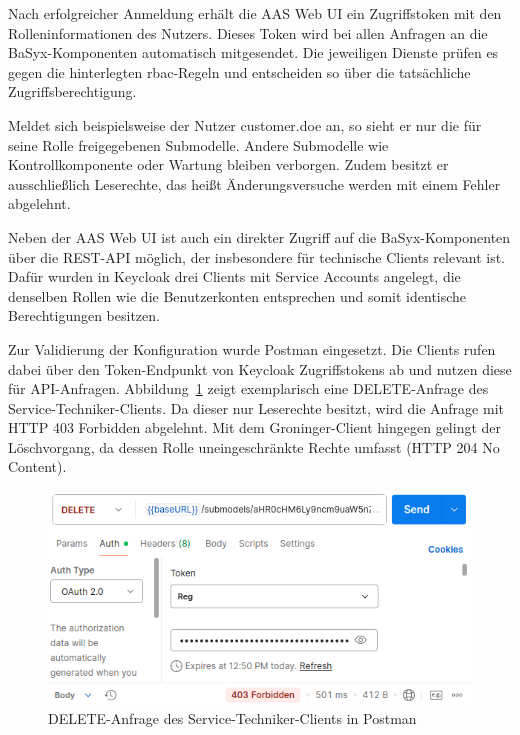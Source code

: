 Nach erfolgreicher Anmeldung erhält die AAS Web UI ein Zugriffstoken mit den Rolleninformationen des Nutzers.
Dieses Token wird bei allen Anfragen an die BaSyx-Komponenten automatisch mitgesendet.
Die jeweiligen Dienste prüfen es gegen die hinterlegten \acs{rbac}-Regeln und entscheiden so über die tatsächliche Zugriffsberechtigung.

Meldet sich beispielsweise der Nutzer customer.doe an, so sieht er nur die für seine Rolle freigegebenen Submodelle. 
Andere Submodelle wie Kontrollkomponente oder Wartung bleiben verborgen. 
Zudem besitzt er ausschließlich Leserechte, das heißt Änderungsversuche werden mit einem Fehler abgelehnt.

Neben der AAS Web UI ist auch ein direkter Zugriff auf die BaSyx-Komponenten über die REST-API möglich, der insbesondere für technische Clients relevant ist. 
Dafür wurden in Keycloak drei Clients mit Service Accounts angelegt, die denselben Rollen wie die Benutzerkonten entsprechen und somit identische Berechtigungen besitzen.

Zur Validierung der Konfiguration wurde Postman eingesetzt. 
Die Clients rufen dabei über den Token-Endpunkt von Keycloak Zugriffstokens ab und nutzen diese für API-Anfragen. 
Abbildung~\ref{fig:KeycloakAnmeldeSeite} zeigt exemplarisch eine DELETE-Anfrage des Service-Techniker-Clients. 
Da dieser nur Leserechte besitzt, wird die Anfrage mit HTTP 403 Forbidden abgelehnt. 
Mit dem Groninger-Client hingegen gelingt der Löschvorgang, da dessen Rolle uneingeschränkte Rechte umfasst (HTTP 204 No Content).

\begin{figure}[htbp]
    \centering
        \includegraphics{Bilder/Ergebnisse/DPP/Postman/TechnicianDelet.png}
    \caption{DELETE-Anfrage des Service-Techniker-Clients in Postman}
    \label{fig:KeycloakAnmeldeSeite}
\end{figure}

